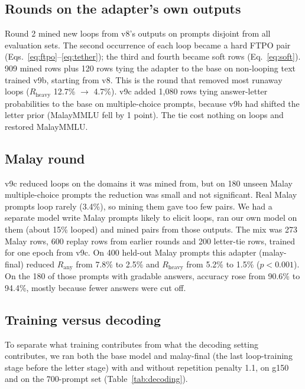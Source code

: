 \documentclass[11pt]{article}
\newcommand{\Rany}{R_{\text{any}}}
\newcommand{\Rheavy}{R_{\text{heavy}}}
\begin{document}
\subsection{Rounds on the adapter's own outputs}

Round 2 mined new loops from v8's outputs on prompts disjoint from all evaluation sets. The second occurrence of each loop became a hard FTPO pair (Eqs.~\ref{eq:ftpo}--\ref{eq:tether}); the third and fourth became soft rows (Eq.~\ref{eq:soft}). 909 mined rows plus 120 rows tying the adapter to the base on non-looping text trained v9b, starting from v8. This is the round that removed most runaway loops ($\Rheavy$ 12.7\% $\rightarrow$ 4.7\%). v9c added 1,080 rows tying answer-letter probabilities to the base on multiple-choice prompts, because v9b had shifted the letter prior (MalayMMLU fell by 1 point). The tie cost nothing on loops and restored MalayMMLU.

\subsection{Malay round}

v9c reduced loops on the domains it was mined from, but on 180 unseen Malay multiple-choice prompts the reduction was small and not significant. Real Malay prompts loop rarely (3.4\%), so mining them gave too few pairs. We had a separate model write Malay prompts likely to elicit loops, ran our own model on them (about 15\% looped) and mined pairs from those outputs. The mix was 273 Malay rows, 600 replay rows from earlier rounds and 200 letter-tie rows, trained for one epoch from v9c. On 400 held-out Malay prompts this adapter (malay-final) reduced $\Rany$ from 7.8\% to 2.5\% and $\Rheavy$ from 5.2\% to 1.5\% ($p<0.001$). On the 180 of those prompts with gradable answers, accuracy rose from 90.6\% to 94.4\%, mostly because fewer answers were cut off.

\subsection{Training versus decoding}
\label{sec:decoding}

To separate what training contributes from what the decoding setting contributes, we ran both the base model and malay-final (the last loop-training stage before the letter stage) with and without repetition penalty 1.1, on g150 and on the 700-prompt set (Table~\ref{tab:decoding}).
\end{document}
